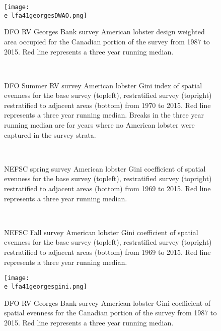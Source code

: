 \documentclass[11pt]{article}
\newcommand{\e}{/backup/bio_data/bio.lobster/figures/} %
\begin{document}
\begin{figure}

    \texttt{[image: \\e lfa41georgesDWAO.png]}
    \caption{DFO RV Georges Bank survey American lobster design weighted area occupied for the Canadian portion of the survey from 1987 to 2015. Red line represents a three year running median. }

\end{figure}



\begin{figure}
\centering
{}
\\
\caption{DFO Summer RV survey American lobster Gini index of spatial evenness for the base survey (topleft), restratified survey (topright) restratified to adjacent areas (bottom) from 1970 to 2015. Red line represents a three year running median. Breaks in the three year running median are for years where no American lobster were captured in the survey strata.}
\end{figure}
\clearpage


\begin{figure}
\centering
{}
\\
\caption{NEFSC spring survey American lobster Gini coefficient of spatial evenness for the base survey (topleft), restratified survey (topright) restratified to adjacent areas (bottom) from 1969 to 2015. Red line represents a three year running median.  }
\end{figure}
\clearpage



\begin{figure}
\centering
{}
\\
\caption{NEFSC Fall survey American lobster Gini coefficient of spatial evenness for the base survey (topleft), restratified survey (topright) restratified to adjacent areas (bottom) from 1969 to 2015. Red line represents a three year running median.  }
\end{figure}
\clearpage


\begin{figure}

    \texttt{[image: \\e lfa41georgesgini.png]}
    \caption{DFO RV Georges Bank survey American lobster Gini coefficient of spatial evenness for the Canadian portion of the survey from 1987 to 2015. Red line represents a three year running median. }

\end{figure}
\end{document}
